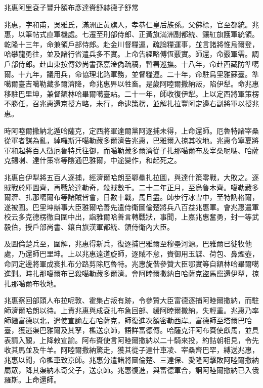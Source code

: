 
\begin{pinyinscope}
兆惠阿里袞子豐升額布彥達賚舒赫德子舒常

兆惠，字和甫，吳雅氏，滿洲正黃旗人，孝恭仁皇后族孫。父佛標，官至都統。兆惠，以筆帖式直軍機處。七遷至刑部侍郎、正黃旗滿洲副都統、鑲紅旗護軍統領。乾隆十三年，命兼領戶部侍郎。赴金川督糧運，疏論糧運事，並言諸將惟烏爾登，哈攀龍勇往，並及諸行省遣兵多不實。上命告經略傅恆覈實。師還，命覈軍需。調戶部侍郎。赴山東按傳鈔尚書孫嘉淦偽疏稿，暫署巡撫。十八年，命赴西藏防準噶爾。十九年，議用兵，命協理北路軍務，並督糧運。二十年，命駐烏里雅蘇臺。準噶爾臺吉噶勒藏多爾濟降，命兆惠畀以牲畜。是歲阿睦爾撒納叛，陷伊犁。命兆惠移駐巴里坤，兼督額林哈畢爾噶臺站。二十一年，師收復伊犁。上以定西將軍策楞不勝任，召兆惠還京授方略，未行，命逮策楞，並解扎拉豐阿定邊右副將軍以授兆惠。

時阿睦爾撒納北遁哈薩克，定西將軍達爾黨阿逐捕未得，上命還師。厄魯特諸宰桑從軍者謀為亂，綽囉斯汗噶勒藏多爾濟告兆惠，巴雅爾入掠其牧地。兆惠令寧夏將軍和起將百人徵厄魯特兵往御，而噶勒藏多爾濟從子扎那噶爾布及宰桑呢嗎、哈薩克錫喇、達什策零等陰通巴雅爾，中途變作，和起死之。

兆惠自伊犁將五百人逐捕，經濟爾哈朗至鄂壘扎拉圖，與達什策零戰，大敗之。逐賊戰於庫圖齊，再戰於達勒奇，殺賊數千。二十二年正月，至烏魯木齊。噶勒藏多爾濟、扎那噶爾布等諸賊皆會，日數十戰，馬且盡。師步行冰雪中，至特訥格爾，遂被圍。巴里坤辦事大臣雅爾哈善先遣侍衛圖倫楚將兵八百益兆惠軍。會兆惠遣軍校云多克德楞徹自圍中出，詣雅爾哈善言轉戰狀，事聞，上嘉兆惠奮勇，封一等武毅伯，授戶部尚書、鑲白旗漢軍都統、領侍衛內大臣。

及圖倫楚兵至，圍解，兆惠得新兵，復逐捕巴雅爾至穆壘河源。巴雅爾已徙牧他處，乃還師巴里坤。上以兆惠遠道旋師，逐賊不怠，賚御用玉韘、荷包、鼻煙壺，命同定邊將軍成袞扎布分路剪除厄魯特。兆惠旋偕參贊大臣鄂實等自額林哈畢爾噶進剿。時扎那噶爾布已殺噶勒藏多爾濟。會阿睦爾撒納自哈薩克盜馬竄還伊犁，掠扎那噶爾布牧地。

兆惠察回部頭人布拉呢敦、霍集占叛有跡，令參贊大臣富德逐捕阿睦爾撒納，而駐師濟爾哈朗以待。上責兆惠與成袞扎布急回部、緩阿睦爾撒納，失輕重。兆惠乃率師繼富德以北，遣使宣諭左右哈薩克，師復進次額密勒西岸。富德師至塔爾巴哈臺，獲逃渠巴雅爾及其孥，檻送京師，語詳富德傳。哈薩克汗阿布賚使獻馬，並具表請入覲，上降敕宣諭。阿布賚使言阿睦爾撒納以二十騎來投，約詰朝相見，令先收其馬並及牛羊。阿睦爾撒納驚走，獲其從子達什車凌、宰桑齊巴罕，縛送兆惠，兆惠以聞，命檻車致京師。兆惠分遣諸將圖倫楚、三達保、愛隆阿擊敗阿睦爾撒納屬眾，降其渠納木奇父子，送京師。兆惠復進，與富德軍合，詗阿睦爾撒納已入俄羅斯。上命還師。


\end{pinyinscope}
